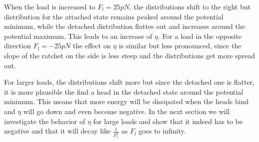 \documentclass[aps,pre,onecolumn,showpacs,showkeys,a4paper]{revtex4}
\begin{document}
When the load is increased to $F_l= 25 pN$, the distributions shift to the right but distribution for the attached state remains peaked around the potential minimum, while the detached distribution flattes out and increases around the potential maximum. 
This leads to an increase of $\eta$. 
For a load in the opposite direction $F_l = -25 pN$ the effect on $\eta$ is similar but less pronounced, since the slope of the ratchet on the side is less steep and the distributions get more spread out. 


For larger loads, the distributions shift more but since the detached one is flatter, it is more plausible the find a head in the detached state around the potential minimum. 
This means that more energy will be dissipated when the heads bind and $\eta$ will go down and even become negative. 
In the next section we will investigate the behavior of $\eta$ for large loads and show that it indeed has to be negative and that it will decay like $\frac{1}{F_l^2}$ as $F_l$ goes to infinity.
\end{document}
